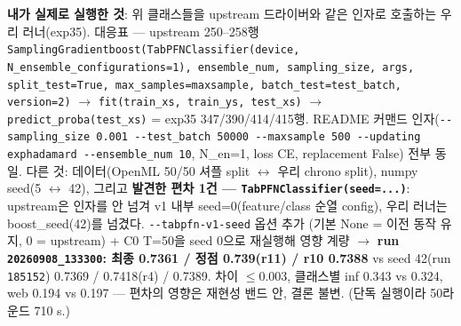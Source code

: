 \par\noindent \textbullet\enspace \textbf{내가 실제로 실행한 것}: 위 클래스들을 upstream 드라이버와 같은 인자로 호출하는 우리 러너(exp35). 대응표 — upstream 250–258행 \texttt{Sampling\allowbreak{}Gradient\allowbreak{}boost(Ta\allowbreak{}bPFNClas\allowbreak{}sifier(d\allowbreak{}evice,\allowbreak{} N\allowbreak{}\_\allowbreak{}\allowbreak{}ensembl\allowbreak{}e\_\allowbreak{}\allowbreak{}config\allowbreak{}urations\allowbreak{}=\allowbreak{}\allowbreak{}1),\allowbreak{} ens\allowbreak{}emble\_\allowbreak{}\allowbreak{}nu\allowbreak{}m,\allowbreak{} sampl\allowbreak{}ing\_\allowbreak{}\allowbreak{}size\allowbreak{},\allowbreak{} args,\allowbreak{} \allowbreak{}split\_\allowbreak{}\allowbreak{}te\allowbreak{}st=\allowbreak{}\allowbreak{}True,\allowbreak{} max\_\allowbreak{}\allowbreak{}sam\allowbreak{}ples=\allowbreak{}\allowbreak{}max\allowbreak{}sample,\allowbreak{} \allowbreak{}batch\_\allowbreak{}\allowbreak{}te\allowbreak{}st=\allowbreak{}\allowbreak{}test\_\allowbreak{}\allowbreak{}batch,\allowbreak{} v\allowbreak{}ersion=\allowbreak{}\allowbreak{}2\allowbreak{})}  \ensuremath{\rightarrow}  \texttt{fit(trai\allowbreak{}n\_\allowbreak{}\allowbreak{}xs,\allowbreak{} tr\allowbreak{}ain\_\allowbreak{}\allowbreak{}ys,\allowbreak{} \allowbreak{}test\_\allowbreak{}\allowbreak{}xs)\allowbreak{}}  \ensuremath{\rightarrow}  \texttt{predict\_\allowbreak{}\allowbreak{}proba(te\allowbreak{}st\_\allowbreak{}\allowbreak{}xs)} =\allowbreak{} exp35 347/\allowbreak{}390/\allowbreak{}414/\allowbreak{}415행. README 커맨드 인자(\texttt{-\allowbreak{}-\allowbreak{}sampli\allowbreak{}ng\_\allowbreak{}\allowbreak{}size \allowbreak{}0.\allowbreak{}001 -\allowbreak{}-\allowbreak{}test\_\allowbreak{}\allowbreak{}bat\allowbreak{}ch 50000\allowbreak{} -\allowbreak{}-\allowbreak{}maxsa\allowbreak{}mple 500\allowbreak{} -\allowbreak{}-\allowbreak{}updat\allowbreak{}ing exph\allowbreak{}adamard \allowbreak{}-\allowbreak{}-\allowbreak{}ensemb\allowbreak{}le\_\allowbreak{}\allowbreak{}num 1\allowbreak{}0}, N\_\allowbreak{}en=\allowbreak{}1, loss CE, replacement False) 전부 동일. 다른 것: 데이터(OpenML 50/\allowbreak{}50 셔플 split  \ensuremath{\leftrightarrow}  우리 chrono split), numpy seed(5  \ensuremath{\leftrightarrow}  42), 그리고 \textbf{발견한 편차 1건 — \texttt{TabPFNCl\allowbreak{}assifier\allowbreak{}(seed=\allowbreak{}\allowbreak{}.\allowbreak{}.\allowbreak{}.\allowbreak{})}}: upstream은 인자를 안 넘겨 v1 내부 seed=\allowbreak{}0(feature/\allowbreak{}class 순열 config), 우리 러너는 boost\_\allowbreak{}seed(42)를 넘겼다. \texttt{-\allowbreak{}-\allowbreak{}tabpfn\allowbreak{}-\allowbreak{}v1-\allowbreak{}seed\allowbreak{}} 옵션 추가 (기본 None =\allowbreak{} 이전 동작 유지, 0 =\allowbreak{} upstream) +\allowbreak{} C0 T=\allowbreak{}50을 seed 0으로 재실행해 영향 계량  \ensuremath{\rightarrow}  \textbf{run \texttt{20260908\allowbreak{}\_\allowbreak{}\allowbreak{}133300}: 최종 0.7361 /\allowbreak{} 정점 0.739(r11) /\allowbreak{} r10 0.7388} vs seed 42(run \texttt{185152}) 0.7369 /\allowbreak{} 0.7418(r4) /\allowbreak{} 0.7389. 차이 \ensuremath{\leq}0.003, 클래스별 inf 0.343 vs 0.324, web 0.194 vs 0.197 — 편차의 영향은 재현성 밴드 안, 결론 불변. (단독 실행이라 50라운드 710 s.)


